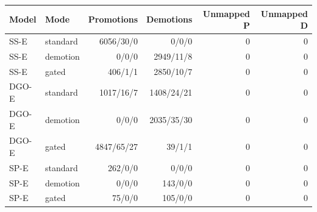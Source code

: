 \begin{tabular}{llrrrr}
\toprule
Model & Mode & Promotions & Demotions & Unmapped P & Unmapped D \\
\midrule
SS-E & standard & 6056/30/0 & 0/0/0 & 0 & 0 \\
SS-E & demotion & 0/0/0 & 2949/11/8 & 0 & 0 \\
SS-E & gated & 406/1/1 & 2850/10/7 & 0 & 0 \\
DGO-E & standard & 1017/16/7 & 1408/24/21 & 0 & 0 \\
DGO-E & demotion & 0/0/0 & 2035/35/30 & 0 & 0 \\
DGO-E & gated & 4847/65/27 & 39/1/1 & 0 & 0 \\
SP-E & standard & 262/0/0 & 0/0/0 & 0 & 0 \\
SP-E & demotion & 0/0/0 & 143/0/0 & 0 & 0 \\
SP-E & gated & 75/0/0 & 105/0/0 & 0 & 0 \\
\bottomrule
\end{tabular}

